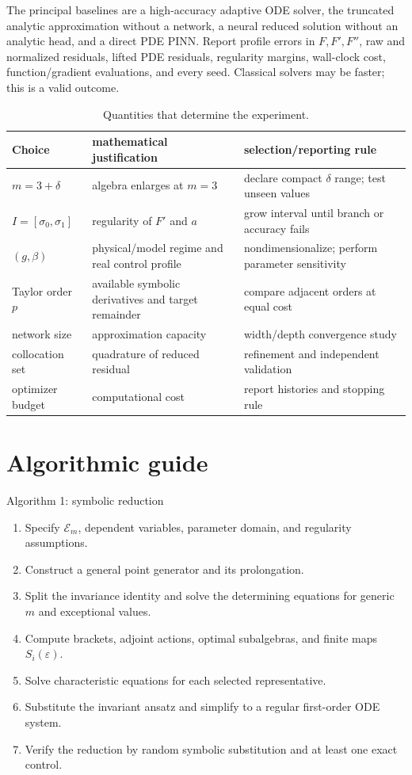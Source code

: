 \documentclass[11pt]{article}
\newcommand{\E}{\mathcal E}
\newcommand{\eps}{\varepsilon}
\begin{document}
The principal baselines are a high-accuracy adaptive ODE solver, the truncated analytic approximation without a network, a neural reduced solution without an analytic head, and a direct PDE PINN.  Report profile errors in $F,F',F''$, raw and normalized residuals, lifted PDE residuals, regularity margins, wall-clock cost, function/gradient evaluations, and every seed.  Classical solvers may be faster; this is a valid outcome.

\begin{table}[t]
\centering
\caption{Quantities that determine the experiment.}
\label{tab:choices}
\begin{tabularx}{\textwidth}{@{}l X X@{}}
\toprule
Choice & mathematical justification & selection/reporting rule\\
\midrule
$m=3+\delta$ & algebra enlarges at $m=3$ & declare compact $\delta$ range; test unseen values\\
$I=[\sigma_0,\sigma_1]$ & regularity of $F'$ and $a$ & grow interval until branch or accuracy fails\\
$(g,\beta)$ & physical/model regime and real control profile & nondimensionalize; perform parameter sensitivity\\
Taylor order $p$ & available symbolic derivatives and target remainder & compare adjacent orders at equal cost\\
network size & approximation capacity & width/depth convergence study\\
collocation set & quadrature of reduced residual & refinement and independent validation\\
optimizer budget & computational cost & report histories and stopping rule\\
\bottomrule
\end{tabularx}
\end{table}

\section{Algorithmic guide}

\begin{instruction}{Algorithm 1: symbolic reduction}
\begin{enumerate}[label=\arabic*.]
\item Specify $\E_m$, dependent variables, parameter domain, and regularity assumptions.
\item Construct a general point generator and its prolongation.
\item Split the invariance identity and solve the determining equations for generic $m$ and exceptional values.
\item Compute brackets, adjoint actions, optimal subalgebras, and finite maps $S_i(\eps)$.
\item Solve characteristic equations for each selected representative.
\item Substitute the invariant ansatz and simplify to a regular first-order ODE system.
\item Verify the reduction by random symbolic substitution and at least one exact control.
\end{enumerate}
\end{instruction}
\end{document}
